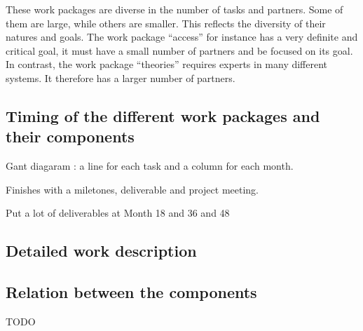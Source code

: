 These work packages are diverse in the number of tasks and
partners. Some of them are large, while others are smaller. This
reflects the diversity of their natures and goals. The work package
``access'' for instance has a very definite and critical goal, it must
have a small number of partners and be focused on its goal. In
contrast, the work package ``theories'' requires experts in many
different systems.  It therefore has a larger number of partners.


\wpfigstyle{\scriptsize\setlength{\tabcolsep}{2pt}}
\wpfig%

\subsection{Timing of the different work packages and their components}

Gant diagaram : a line for each task
and a column for each month.

Finishes with a miletones, deliverable and project meeting.

Put a lot of deliverables at Month 18 and 36 and 48

\ganttchart[draft,xscale=.32] 


\subsection{Detailed work description}

\begin{workplan}
%
















\end{workplan}



\subsection{Relation between the components}


{\color{red} TODO}
